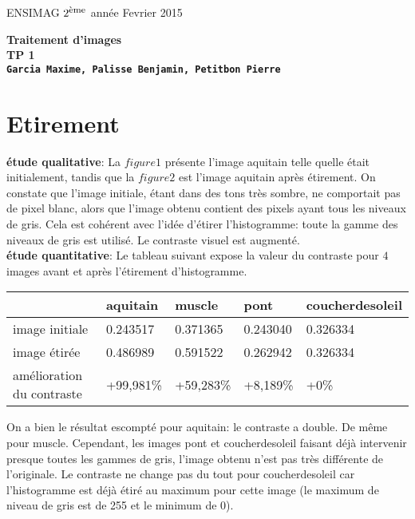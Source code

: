 \documentclass[12pt]{article}
\newcommand{\noi}{\noindent}
\numberwithin{equation}{section}
\begin{document}
\baselineskip7mm

\noi ENSIMAG $2^{\footnotesize \mbox{ème}}$ année   \hfill Fevrier 2015


\vspace{1cm}


\begin{center}
{\Large \bf Traitement d'images\\ TP 1 \\ \texttt{Garcia Maxime, Palisse Benjamin, Petitbon Pierre}}
\end{center}

\vspace{5mm}


\section{Etirement}

\textbf{étude qualitative}: La $figure 1$ présente l'image aquitain telle quelle était initialement, tandis que la $figure 2$ est l'image aquitain après étirement. On constate que l'image initiale, étant dans des tons très sombre, ne comportait pas de pixel blanc, alors que l'image obtenu contient des pixels ayant tous les niveaux de gris. Cela est cohérent avec l'idée d'étirer l'histogramme: toute la gamme des niveaux de gris est utilisé. Le contraste visuel est augmenté.\\

\textbf{étude quantitative}: Le tableau suivant expose la valeur du contraste pour $4$ images avant et après l'étirement d'histogramme.\\
\begin{center}
  \begin{tabular}{|l|l|l|l|l|}
    \hline
    & aquitain & muscle & pont & coucherdesoleil\\
    \hline
    image initiale & 0.243517 & 0.371365 & 0.243040 & 0.326334\\
    \hline
    image étirée & 0.486989 & 0.591522 & 0.262942 & 0.326334 \\
    \hline
    amélioration du contraste & +99,981\% & +59,283\% & +8,189\% & +0\% \\
    \hline
  \end{tabular}
\end{center}
On a bien le résultat escompté pour aquitain: le contraste a double. De même pour muscle. Cependant, les images pont et coucherdesoleil faisant déjà intervenir presque toutes les gammes de gris, l'image obtenu n'est pas très différente de l'originale. Le contraste ne change pas du tout pour coucherdesoleil car l'histogramme est déjà étiré au maximum pour cette image (le maximum de niveau de gris est de 255 et le minimum de 0).
\end{document}
